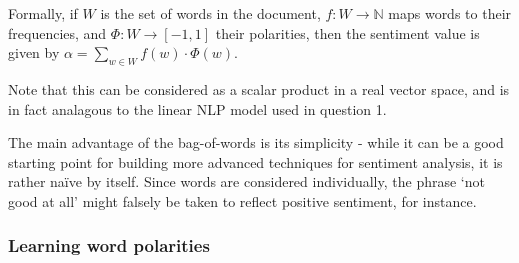 \documentclass[11pt]{article}
\begin{document}
Formally, if $W$ is the set of words in the document, $f:W \to \mathbb{N}$ maps
words to their frequencies, and $\Phi:W \to [-1, 1]$ their polarities, then the
sentiment value is given by $\alpha = \sum_{w \in W} f(w)\cdot\Phi(w)$.

Note that this can be considered as a scalar product in a real vector space, and is in fact analagous to the linear NLP model used in question 1.

The main advantage of the bag-of-words is its simplicity - while it can be a
good starting point for building more advanced techniques for sentiment
analysis, it is rather naïve by itself. Since words are considered
individually, the phrase `not good at all' might falsely be taken to reflect
positive sentiment, for instance.

\subsubsection*{Learning word polarities}


{}

\end{document}
